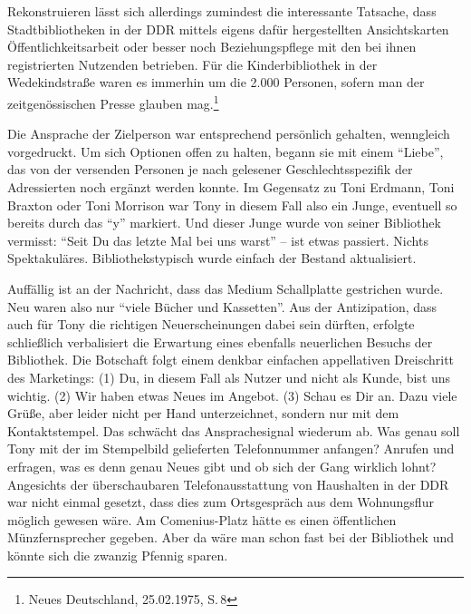 \documentclass[a4paper,
fontsize=11pt,
oneside,
numbers=noperiodatend,
parskip=half-,
bibliography=totoc,
final
]{scrartcl}
\begin{document}
Rekonstruieren lässt sich allerdings zumindest die interessante
Tatsache, dass Stadtbibliotheken in der DDR mittels eigens dafür
hergestellten Ansichtskarten Öffentlichkeitsarbeit oder besser noch
Beziehungspflege mit den bei ihnen registrierten Nutzenden betrieben.
Für die Kinderbibliothek in der Wedekindstraße waren es immerhin um die
2.000 Personen, sofern man der zeitgenössischen Presse glauben
mag.\footnote{Neues Deutschland, 25.02.1975, S.\,8}

Die Ansprache der Zielperson war entsprechend persönlich gehalten,
wenngleich vorgedruckt. Um sich Optionen offen zu halten, begann sie mit
einem \enquote{Liebe}, das von der versenden Personen je nach gelesener
Geschlechtsspezifik der Adressierten noch ergänzt werden konnte. Im
Gegensatz zu Toni Erdmann, Toni Braxton oder Toni Morrison war Tony in
diesem Fall also ein Junge, eventuell so bereits durch das \enquote{y}
markiert. Und dieser Junge wurde von seiner Bibliothek vermisst:
\enquote{Seit Du das letzte Mal bei uns warst} -- ist etwas passiert.
Nichts Spektakuläres. Bibliothekstypisch wurde einfach der Bestand
aktualisiert.

Auffällig ist an der Nachricht, dass das Medium Schallplatte gestrichen
wurde. Neu waren also nur \enquote{viele Bücher und Kassetten}. Aus der
Antizipation, dass auch für Tony die richtigen Neuerscheinungen dabei
sein dürften, erfolgte schließlich verbalisiert die Erwartung eines
ebenfalls neuerlichen Besuchs der Bibliothek. Die Botschaft folgt einem
denkbar einfachen appellativen Dreischritt des Marketings: (1) Du, in
diesem Fall als Nutzer und nicht als Kunde, bist uns wichtig. (2) Wir
haben etwas Neues im Angebot. (3) Schau es Dir an. Dazu viele Grüße,
aber leider nicht per Hand unterzeichnet, sondern nur mit dem
Kontaktstempel. Das schwächt das Ansprachesignal wiederum ab. Was genau
soll Tony mit der im Stempelbild gelieferten Telefonnummer anfangen?
Anrufen und erfragen, was es denn genau Neues gibt und ob sich der Gang
wirklich lohnt? Angesichts der überschaubaren Telefonausstattung von
Haushalten in der DDR war nicht einmal gesetzt, dass dies zum
Ortsgespräch aus dem Wohnungsflur möglich gewesen wäre. Am
Comenius-Platz hätte es einen öffentlichen Münzfernsprecher gegeben.
Aber da wäre man schon fast bei der Bibliothek und könnte sich die
zwanzig Pfennig sparen.
\end{document}
